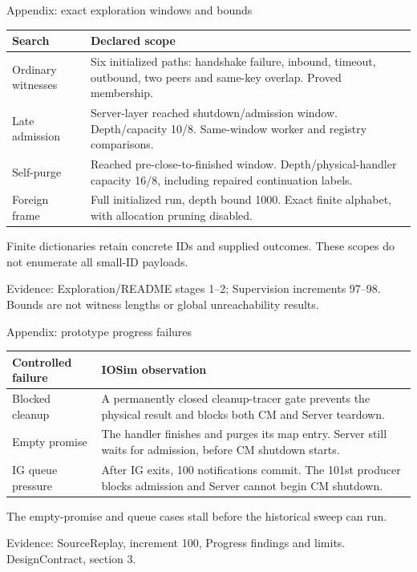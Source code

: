 \documentclass[11pt,aspectratio=169]{beamer}
\newcommand{\evidence}[1]{\vfill{\fontsize{7}{8}\selectfont\color{Muted}Evidence: #1\par}}
\begin{document}
\begin{frame}{Appendix: exact exploration windows and bounds}
\small\renewcommand{\arraystretch}{1.2}
\begin{tabularx}{\textwidth}{@{}P{28mm}Y@{}}
\toprule
Search & Declared scope \\ \midrule
Ordinary witnesses & Six initialized paths: handshake failure, inbound, timeout, outbound, two peers and same-key overlap. Proved membership. \\[2mm]
Late admission & Server-layer reached shutdown/admission window. Depth/capacity 10/8. Same-window worker and registry comparisons. \\[2mm]
Self-purge & Reached pre-close-to-finished window. Depth/physical-handler capacity 16/8, including repaired continuation labels. \\[2mm]
Foreign frame & Full initialized run, depth bound 1000. Exact finite alphabet, with allocation pruning disabled. \\[2mm]
\bottomrule
\end{tabularx}\par\vspace{2mm}\small Finite dictionaries retain concrete IDs and supplied outcomes. These scopes do not enumerate all small-ID payloads.
\evidence{Exploration/README stages 1--2; Supervision increments 97--98. Bounds are not witness lengths or global unreachability results.}
\end{frame}

\begin{frame}{Appendix: prototype progress failures}
\small\renewcommand{\arraystretch}{1.2}
\begin{tabularx}{\textwidth}{@{}P{28mm}Y@{}}
\toprule
Controlled failure & IOSim observation \\ \midrule
Blocked cleanup & A permanently closed cleanup-tracer gate prevents the physical result and blocks both CM and Server teardown. \\[2mm]
Empty promise & The handler finishes and purges its map entry. Server still waits for admission, before CM shutdown starts. \\[2mm]
IG queue pressure & After IG exits, 100 notifications commit. The 101st producer blocks admission and Server cannot begin CM shutdown. \\[2mm]
\bottomrule
\end{tabularx}\par\vspace{2mm}
The empty-promise and queue cases stall before the historical sweep can run.
\evidence{SourceReplay, increment 100, Progress findings and limits. DesignContract, section 3.}
\end{frame}
\end{document}
